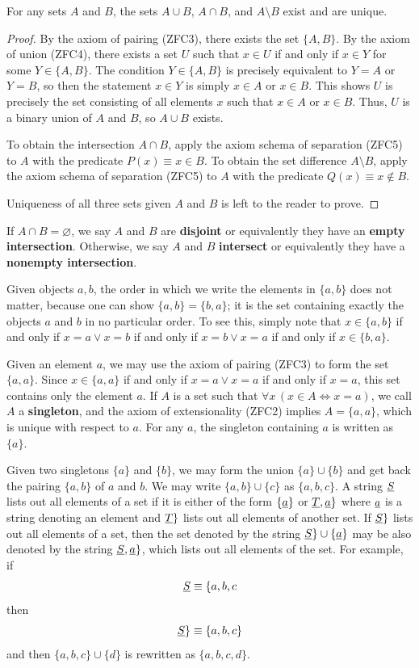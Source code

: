 \begin{prop}\label{ch1thm_binary_set_ops_exist}
	For any sets $A$ and $B$, the sets $A\cup B$, $A\cap B$, and $A\setminus B$ exist and are unique. 
\end{prop}
\begin{proof}
	By the axiom of pairing (ZFC3), there exists the set $\{A, B\}$.
	By the axiom of union (ZFC4), there exists a set $U$ such that $x\in U$ if and only if $x\in Y$ for some $Y\in\{A, B\}$. 
	The condition $Y\in\{A, B\}$ is precisely equivalent to $Y = A$ or $Y = B$, so then the statement $x\in Y$ is simply $x\in A$ or $x\in B$. 
	This shows $U$ is precisely the set consisting of all elements $x$ such that $x\in A$ or $x\in B$.
	Thus, $U$ is a binary union of $A$ and $B$, so $A\cup B$ exists.
	
	To obtain the intersection $A\cap B$, apply the axiom schema of separation (ZFC5) to $A$ with the predicate $P(x)\equiv x\in B$. 
	To obtain the set difference $A\setminus B$, apply the axiom schema of separation (ZFC5) to $A$ with the predicate $Q(x)\equiv x\notin B$. 
	
	Uniqueness of all three sets given $A$ and $B$ is left to the reader to prove.
\end{proof}

If $A\cap B = \varnothing$, we say $A$ and $B$ are \textbf{disjoint} or equivalently they have an \textbf{empty intersection}.
Otherwise, we say $A$ and $B$ \textbf{intersect} or equivalently they have a \textbf{nonempty intersection}.

Given objects $a, b$, the order in which we write the elements in $\{a, b\}$ does not matter, because one can show $\{a, b\} = \{b, a\}$; it is the set containing exactly the objects $a$ and $b$ in no particular order.
To see this, simply note that $x\in\{a, b\}$ if and only if $x = a\lor x = b$ if and only if $x = b\lor x = a$ if and only if $x\in \{b, a\}$.

Given an element $a$, we may use the axiom of pairing (ZFC3) to form the set $\{a, a\}$. 
Since $x\in\{a, a\}$ if and only if $x = a\lor x = a$ if and only if $x = a$, this set contains only the element $a$.
If $A$ is a set such that $\forall x\, (x\in A\iff x = a)$, we call $A$ a \textbf{singleton}, and the axiom of extensionality (ZFC2) implies $A = \{a, a\}$, which is unique with respect to $a$. 
For any $a$, the singleton containing $a$ is written as $\{a\}$.

Given two singletons $\{a\}$ and $\{b\}$, we may form the union $\{a\}\cup\{b\}$ and get back the pairing $\{a, b\}$ of $a$ and $b$. 
We may write $\{a, b\}\cup\{c\}$ as $\{a, b, c\}$. 
A string $\underline{S}$ lists out all elements of a set if it is either of the form $\{\underline{a}\}$ or $\underline{T},\underline{a}\}$ where $\underline{a}$ is a string denoting an element and $\underline{T}\}$ lists out all elements of another set. 
If $\underline{S}\}$ lists out all elements of a set, then the set denoted by the string $\underline{S}\}\cup\{\underline{a}\}$ may be also denoted by the string $\underline{S}, \underline{a}\}$, which lists out all elements of the set. 
For example, if 
\[ \underline{S}\equiv \{a, b, c \] 
then 
\[ \underline{S}\}\equiv\{a, b, c\} \] 
and then $\{a, b, c\}\cup\{d\}$ is rewritten as $\{a, b, c, d\}$. 

